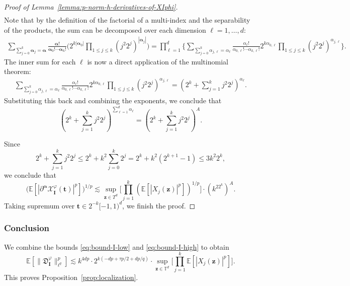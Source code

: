 \documentclass[12pt]{amsart}
\theoremstyle{definition}
\theoremstyle{remark}
\newcommand{\bt}{\boldsymbol{t}}
\newcommand{\bz}{\boldsymbol{z}}
\newcommand{\E}{\mathbb{E}}
\newcommand{\T}{\mathbb{T}}
\numberwithin{equation}{section}
\begin{document}
\begin{proof}[Proof of Lemma~\ref{lemma:p-norm-h-derivatives-of-XIphi}]
\begin{align*}
\end{align*}
Note that by the definition of the factorial of a multi-index and the separability of the products, the sum can be decomposed over each dimension $\ell=1,\ldots,d$:
\begin{align*}
\sum_{\sum_{j=0}^k \boldsymbol{\alpha}_j=\boldsymbol{\alpha}}\frac{\boldsymbol{\alpha}!}{\boldsymbol{\alpha}_0!\cdots \boldsymbol{\alpha}_k!}\bigg(2^{k|\boldsymbol{\alpha}_0|}\prod_{1\le j\le k} (j^2 2^j)^{|\boldsymbol{\alpha}_j|}\bigg)=\prod_{\ell=1}^d \Bigg\{ \sum_{\sum_{j=0}^k \alpha_{j,\ell}=\alpha_\ell}\frac{\alpha_\ell!}{\alpha_{0,\ell}!\cdots \alpha_{k,\ell}!} 2^{k\alpha_{0,\ell}} \prod_{1\le j\le k} (j^2 2^j)^{\alpha_{j,\ell}} \Bigg\}.
\end{align*}
The inner sum for each $\ell$ is now a direct application of the multinomial theorem:
\begin{align*}
    \sum_{\sum_{j=0}^k \alpha_{j,\ell}=\alpha_\ell}\frac{\alpha_\ell!}{\alpha_{0,\ell}!\cdots \alpha_{k,\ell}!} 2^{k\alpha_{0,\ell}} \prod_{1\le j\le k} (j^2 2^j)^{\alpha_{j,\ell}} = \left(2^k+\sum_{j=1}^k j^2 2^j\right)^{\alpha_\ell}.
\end{align*}
Substituting this back and combining the exponents, we conclude that
\begin{equation*}
    \left(2^k+\sum_{j=1}^k j^2 2^j\right)^{\sum_{\ell=1}^d \alpha_\ell} = \left(2^k+\sum_{j=1}^k j^2 2^j\right)^{A}.
\end{equation*}

Since
\[
2^k+\sum_{j=1}^k j^2 2^j\le 2^k+k^2\sum_{j=0}^k 2^j=2^k+k^2(2^{k+1}-1)\le 3k^2 2^k,
\]
we conclude that
\[
	\big(\E[|\partial^{\boldsymbol{\alpha}}\mathcal{X}_{\boldsymbol{I}}^\varphi(\bt)|^p]\big)^{1/p}\lesssim  \sup_{\bz\in T^d}\bigg[\prod_{j=1}^k (\E[|X_j(\bz)|^p])^{1/p}\bigg]\cdot (k^22^k)^A.
\]
Taking supremum over $\bt\in 2^{-k}[-1,1)^d$, we finish the proof.
\end{proof}

\subsubsection{Conclusion}

We combine the bounds \eqref{eq:bound-I-low} and \eqref{eq:bound-I-high} to obtain
\[
\E[\|\mathfrak{D}_{\boldsymbol{I}}^\varphi\|_{\ell^q}^p]\lesssim k^{4dp}\cdot 2^{k(-dp+\tau p/2+dp/q)}\cdot \sup_{\bz\in \T^d}\bigg[\prod_{j=1}^k \E[|X_j(\bz)|^p]\bigg].
\]
This proves Proposition~\ref{prop:localization}.

\appendix
\end{document}
